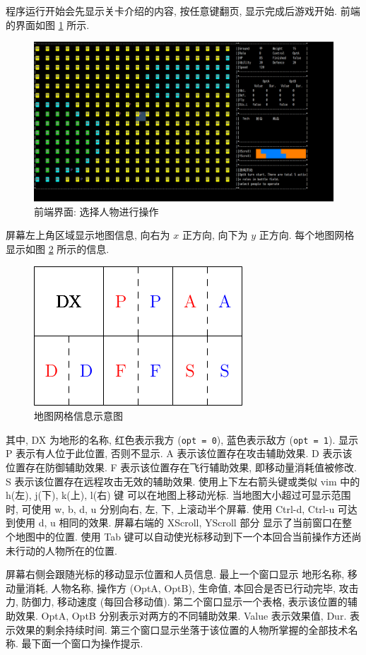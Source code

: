 \documentclass[UTF8, zihao=-4]{ctexart} %
\newcommand{\lcode}{\lstinline} % 段内插入代码
\begin{document}
程序运行开始会先显示关卡介绍的内容, 按任意键翻页, 显示完成后游戏开始.
前端的界面如图 \ref{fui_1} 所示.
\begin{figure}
      \centering
      \includegraphics[width=\textwidth]{ui_sel_p.png}
      \caption{\label{fui_1}前端界面: 选择人物进行操作}
\end{figure}
屏幕左上角区域显示地图信息, 向右为 $x$ 正方向, 向下为 $y$ 正方向. 
每个地图网格显示如图 \ref{f_grid} 所示的信息.
\begin{figure}
      \centering
      \includegraphics[scale=1.2]{grid.pdf}
      \caption{\label{f_grid}地图网格信息示意图}
\end{figure}
其中, DX 为地形的名称, 红色表示我方 (\lcode{opt = 0}), 蓝色表示敌方 (\lcode{opt = 1}).
显示 P 表示有人位于此位置, 否则不显示. A 表示该位置存在攻击辅助效果.
D 表示该位置存在防御辅助效果. F 表示该位置存在飞行辅助效果, 即移动量消耗值被修改.
S 表示该位置存在远程攻击无效的辅助效果. 使用上下左右箭头键或类似 vim 中的 h(左), j(下), k(上), l(右) 键
可以在地图上移动光标. 当地图大小超过可显示范围时, 可使用 w, b, d, u 分别向右, 左, 下, 上滚动半个屏幕. 
使用 Ctrl-d, Ctrl-u 可达到使用 d, u 相同的效果. 屏幕右端的 XScroll, YScroll 部分
显示了当前窗口在整个地图中的位置. 使用 Tab 键可以自动使光标移动到下一个本回合当前操作方还尚未行动的人物所在的位置.

屏幕右侧会跟随光标的移动显示位置和人员信息. 最上一个窗口显示
地形名称, 移动量消耗, 人物名称, 操作方 (OptA, OptB), 生命值, 本回合是否已行动完毕, 攻击力, 防御力, 移动速度 (每回合移动值).
第二个窗口显示一个表格, 表示该位置的辅助效果. OptA, OptB 分别表示对两方的不同辅助效果. Value 表示效果值, Dur. 表示效果的剩余持续时间.
第三个窗口显示坐落于该位置的人物所掌握的全部技术名称. 最下面一个窗口为操作提示.
\end{document}
